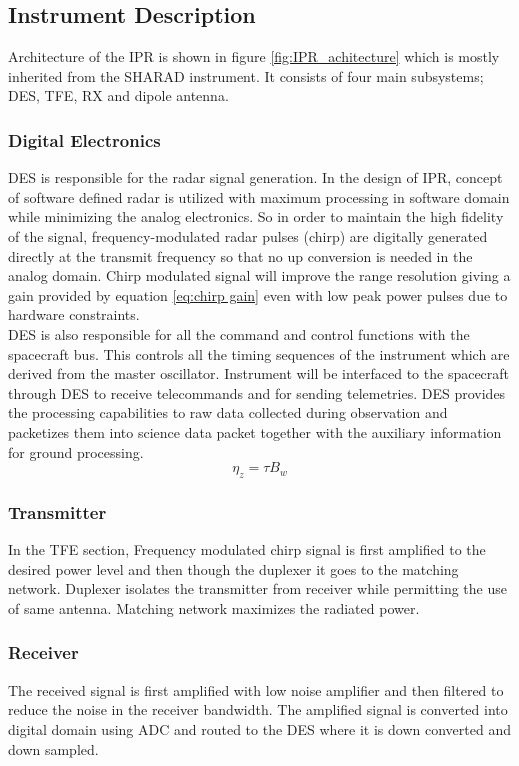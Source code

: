 \subsection{Instrument Description}
Architecture of the \ac{IPR} is shown in figure \ref{fig:IPR_achitecture} which is mostly inherited from the SHARAD instrument. It  consists of four main subsystems; \ac{DES}, \ac{TFE}, \ac{RX} and dipole antenna.
\subsubsection{Digital Electronics}
\ac{DES} is responsible for the radar signal generation. In the design of \ac{IPR}, concept of software defined radar is utilized with maximum processing in software domain while minimizing the analog electronics. So in order to maintain the high fidelity of the signal, frequency-modulated radar pulses (chirp) are digitally generated directly at the transmit frequency so that no up conversion is needed in the analog domain. Chirp modulated signal will improve the range resolution giving a gain provided by equation \ref{eq:chirp gain} even with low peak power pulses due to hardware constraints.\\
\ac{DES} is also responsible for all the command and control functions with the spacecraft bus. This controls all the timing sequences of the instrument which are derived from the master oscillator. Instrument will be interfaced to the spacecraft through \ac{DES} to receive telecommands and for sending telemetries. \ac{DES} provides the processing capabilities to raw data collected during observation and packetizes them into science data packet together with the auxiliary information for ground processing.
\begin{equation}
\eta_{z} = \tau B_{w}
\label{eq:chirp gain}
\end{equation}
%
\subsubsection{Transmitter}
In the \ac{TFE} section, Frequency modulated chirp signal is first amplified to the desired power level and then though the duplexer it goes to the matching network. Duplexer isolates the transmitter from receiver while permitting the use of same antenna. Matching network maximizes the radiated power.
%
\subsubsection{Receiver}
The received signal is first amplified with low noise amplifier and then filtered to reduce the noise in the receiver bandwidth. The amplified signal is converted into digital domain using \ac{ADC} and routed to the \ac{DES} where it is down converted and down sampled.
